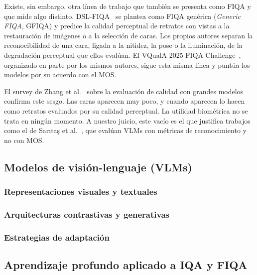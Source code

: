 Existe, sin embargo, otra línea de trabajo que también se presenta como FIQA y que mide algo distinto. DSL-FIQA~\cite{Chen_2024_CVPR} se plantea como FIQA genérica (\textit{Generic FIQA}, GFIQA) y predice la calidad perceptual de retratos con vistas a la restauración de imágenes o a la selección de caras. Los propios autores separan la reconocibilidad de una cara, ligada a la nitidez, la pose o la iluminación, de la degradación perceptual que ellos evalúan. El VQualA 2025 FIQA Challenge~\cite{Ma_2025_ICCVW}, organizado en parte por los mismos autores, sigue esta misma línea y puntúa los modelos por su acuerdo con el MOS.

El survey de Zhang et al.~\cite{Zhang_2025_TOMM} sobre la evaluación de calidad con grandes modelos confirma este sesgo. Las caras aparecen muy poco, y cuando aparecen lo hacen como retratos evaluados por su calidad perceptual. La utilidad biométrica no se trata en ningún momento. A nuestro juicio, este vacío es el que justifica trabajos como el de Sarıtaş et al.~\cite{Saritas_2026_FG}, que evalúan VLMs con métricas de reconocimiento y no con MOS.

\subsection{Modelos de visión-lenguaje (VLMs)}
\subsubsection{Representaciones visuales y textuales}
\subsubsection{Arquitecturas contrastivas y generativas}
\subsubsection{Estrategias de adaptación}

\subsection{Aprendizaje profundo aplicado a IQA y FIQA}
